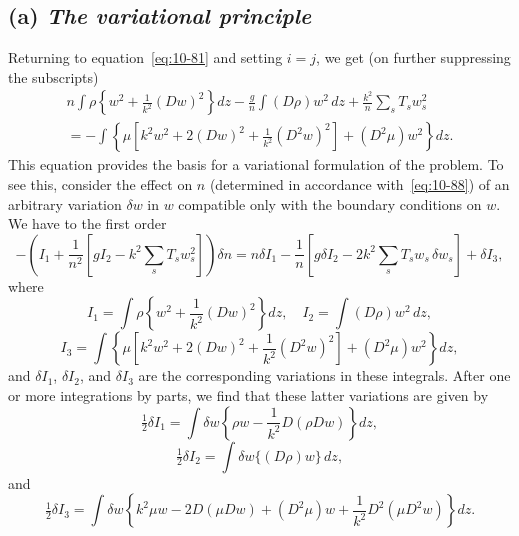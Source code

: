 \subsection*{(a) \textit{The variational principle}}

Returning to equation~\eqref{eq:10-81} and setting $i = j$, we get (on further suppressing the subscripts)
\begin{align}
\label{eq:10-88}
n\int\rho\!\left\{w^2+\frac{1}{k^2}(Dw)^2\right\}\!dz - \frac{g}{n}\int(D\rho)w^2\,dz + \frac{k^2}{n}\sum_s T_sw_s^2 \nonumber\\
= -\int\!\left\{\mu\!\left[k^2w^2+2(Dw)^2+\frac{1}{k^2}(D^2w)^2\right]+(D^2\mu)w^2\right\}\!dz.
\end{align}
This equation provides the basis for a variational formulation of the problem. To see this, consider the effect on $n$ (determined in accordance with~\eqref{eq:10-88}) of an arbitrary variation $\delta w$ in $w$ compatible only with the boundary conditions on $w$. We have to the first order
\begin{equation}
\label{eq:10-89}
-\left(I_1+\frac{1}{n^2}\left[gI_2-k^2\sum_s T_sw_s^2\right]\right)\!\delta n = n\delta I_1 - \frac{1}{n}[g\delta I_2 - 2k^2\sum_s T_sw_s\,\delta w_s] + \delta I_3,
\end{equation}
where
\begin{equation}
\label{eq:10-90}
I_1 = \int\rho\!\left\{w^2+\frac{1}{k^2}(Dw)^2\right\}\!dz, \quad I_2 = \int(D\rho)w^2\,dz,
\end{equation}
\begin{equation}
I_3 = \int\!\left\{\mu\!\left[k^2w^2+2(Dw)^2+\frac{1}{k^2}(D^2w)^2\right]+(D^2\mu)w^2\right\}\!dz,
\end{equation}
and $\delta I_1$, $\delta I_2$, and $\delta I_3$ are the corresponding variations in these integrals. After one or more integrations by parts, we find that these latter variations are given by
\begin{equation}
\label{eq:10-91}
\tfrac{1}{2}\delta I_1 = \int\delta w\!\left\{\rho w - \frac{1}{k^2}D(\rho Dw)\right\}\!dz,
\end{equation}
\begin{equation}
\label{eq:10-92}
\tfrac{1}{2}\delta I_2 = \int\delta w\{(D\rho)w\}\,dz,
\end{equation}
and
\begin{equation}
\label{eq:10-93}
\tfrac{1}{2}\delta I_3 = \int\delta w\!\left\{k^2\mu w - 2D(\mu Dw) + (D^2\mu)w + \frac{1}{k^2}D^2(\mu D^2w)\right\}\!dz.
\end{equation}

